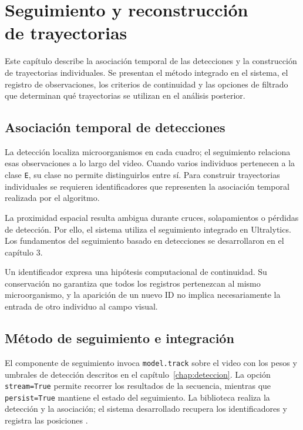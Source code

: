 \chapter[Seguimiento y reconstrucción de trayectorias]{Seguimiento y reconstrucción\\de trayectorias}
\label{chap:seguimiento}

Este capítulo describe la asociación temporal de las detecciones y la construcción de trayectorias individuales. Se presentan el método integrado en el sistema, el registro de observaciones, los criterios de continuidad y las opciones de filtrado que determinan qué trayectorias se utilizan en el análisis posterior.

\section{Asociación temporal de detecciones}

La detección localiza microorganismos en cada cuadro; el seguimiento relaciona esas observaciones a lo largo del video. Cuando varios individuos pertenecen a la clase \texttt{E}, su clase no permite distinguirlos entre sí. Para construir trayectorias individuales se requieren identificadores que representen la asociación temporal realizada por el algoritmo.

La proximidad espacial resulta ambigua durante cruces, solapamientos o pérdidas de detección. Por ello, el sistema utiliza el seguimiento integrado en Ultralytics. Los fundamentos del seguimiento basado en detecciones se desarrollaron en el capítulo 3.

Un identificador expresa una hipótesis computacional de continuidad. Su conservación no garantiza que todos los registros pertenezcan al mismo microorganismo, y la aparición de un nuevo ID no implica necesariamente la entrada de otro individuo al campo visual.

\section{Método de seguimiento e integración}

El componente de seguimiento invoca \texttt{model.track} sobre el video con los pesos y umbrales de detección descritos en el capítulo~\ref{chap:deteccion}. La opción \texttt{stream=True} permite recorrer los resultados de la secuencia, mientras que \texttt{persist=True} mantiene el estado del seguimiento. La biblioteca realiza la detección y la asociación; el sistema desarrollado recupera los identificadores y registra las posiciones \cite{jocher2024}.

